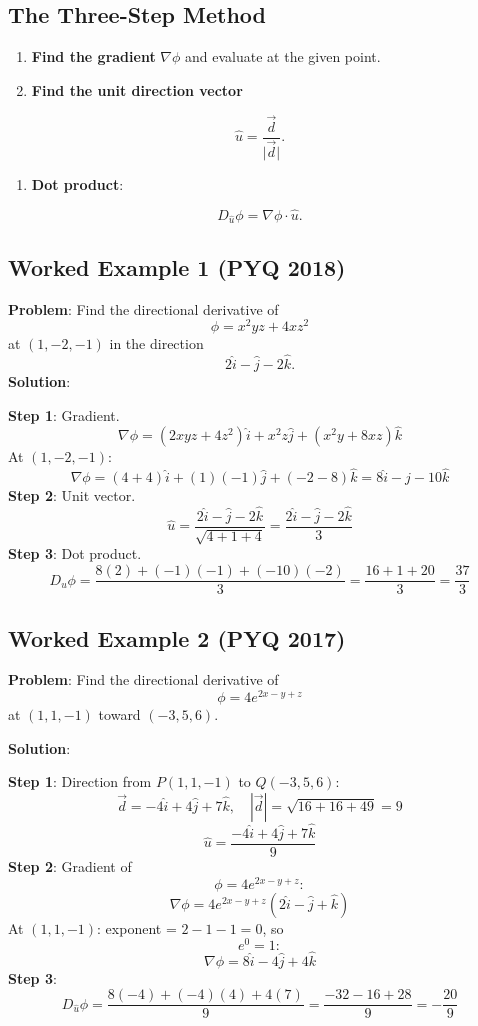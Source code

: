 \documentclass[
]{article}
\providecommand{\tightlist}{%
  \setlength{\itemsep}{0pt}\setlength{\parskip}{0pt}}
\begin{document}
\subsection{The Three-Step Method}\label{the-three-step-method}

\begin{enumerate}
\def\labelenumi{\arabic{enumi}.}
\tightlist
\item
  \textbf{Find the gradient} \(\nabla\phi\) and evaluate at the given
  point.
\item
  \textbf{Find the unit direction vector}
\end{enumerate}
\[
\hat{u} = \frac{\vec{d}}{\lvert \vec{d} \rvert}.
\]
\begin{enumerate}
\def\labelenumi{\arabic{enumi}.}
\setcounter{enumi}{2}
\tightlist
\item
  \textbf{Dot product}:
\end{enumerate}
\[
D_{\hat{u}}\phi = \nabla\phi \cdot \hat{u}.
\]

\subsection{Worked Example 1 (PYQ
2018)}\label{worked-example-1-pyq-2018}

\textbf{Problem}: Find the directional derivative of
\[
\phi = x^2yz + 4xz^2
\]
at \((1, -2, -1)\) in the direction
\[
2\hat{i} - \hat{j} - 2\hat{k}.
\]
\textbf{Solution}:

\textbf{Step 1}: Gradient.
\[
\nabla\phi = (2xyz + 4z^2)\hat{i} + x^2z\hat{j} + (x^2y + 8xz)\hat{k}
\]
At \((1, -2, -1)\):
\[
\nabla\phi = (4 + 4)\hat{i} + (1)(-1)\hat{j} + (-2 - 8)\hat{k} = 8\hat{i} - \hat{j} - 10\hat{k}
\]
\textbf{Step 2}: Unit vector.
\[
\hat{u} = \frac{2\hat{i} - \hat{j} - 2\hat{k}}{\sqrt{4 + 1 + 4}} = \frac{2\hat{i} - \hat{j} - 2\hat{k}}{3}
\]
\textbf{Step 3}: Dot product.
\[
D_{\hat{u}}\phi = \frac{8(2) + (-1)(-1) + (-10)(-2)}{3} = \frac{16 + 1 + 20}{3} = \frac{37}{3}
\]

\subsection{Worked Example 2 (PYQ
2017)}\label{worked-example-2-pyq-2017}

\textbf{Problem}: Find the directional derivative of
\[
\phi = 4e^{2x-y+z}
\]
at \((1, 1, -1)\) toward \((-3, 5, 6)\).

\textbf{Solution}:

\textbf{Step 1}: Direction from \(P(1,1,-1)\) to \(Q(-3,5,6)\):
\[
\vec{d} = -4\hat{i} + 4\hat{j} + 7\hat{k}, \quad |\vec{d}| = \sqrt{16+16+49} = 9
\]
\[
\hat{u} = \frac{-4\hat{i} + 4\hat{j} + 7\hat{k}}{9}
\]
\textbf{Step 2}: Gradient of
\[
\phi = 4e^{2x-y+z}:
\]
\[
\nabla\phi = 4e^{2x-y+z}(2\hat{i} - \hat{j} + \hat{k})
\]
At \((1,1,-1)\): exponent = \(2-1-1 = 0\), so
\[
e^0 = 1:
\]
\[
\nabla\phi = 8\hat{i} - 4\hat{j} + 4\hat{k}
\]
\textbf{Step 3}:
\[
D_{\hat{u}}\phi = \frac{8(-4) + (-4)(4) + 4(7)}{9} = \frac{-32 - 16 + 28}{9} = -\frac{20}{9}
\]
\end{document}

